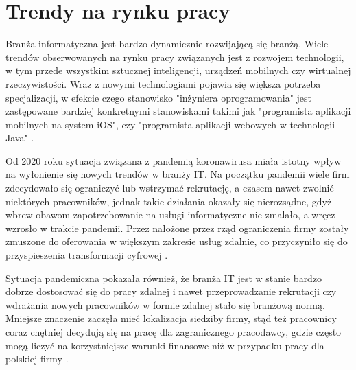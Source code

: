 


\section{Trendy na rynku pracy}

Branża informatyczna jest bardzo dynamicznie rozwijającą się branżą.
Wiele trendów obserwowanych na rynku pracy związanych jest z rozwojem technologii, w tym przede wszystkim sztucznej inteligencji, urządzeń mobilnych czy wirtualnej rzeczywistości.
Wraz z nowymi technologiami pojawia się większa potrzeba specjalizacji, w efekcie czego stanowisko "inżyniera oprogramowania" jest zastępowane bardziej konkretnymi stanowiskami takimi jak "programista aplikacji mobilnych na system iOS", czy "programista aplikacji webowych w technologii Java" \cite{it-polyglots-2015}.

Od 2020 roku sytuacja związana z pandemią koronawirusa miała istotny wpływ na wyłonienie się nowych trendów w branży IT.
Na początku pandemii wiele firm zdecydowało się ograniczyć lub wstrzymać rekrutację, a czasem nawet zwolnić niektórych pracowników, jednak takie działania okazały się nierozsądne, gdyż wbrew obawom zapotrzebowanie na usługi informatyczne nie zmalało, a wręcz wzrosło w trakcie pandemii.
Przez nałożone przez rząd ograniczenia firmy zostały zmuszone do oferowania w większym zakresie usług zdalnie, co przyczyniło się do przyspieszenia transformacji cyfrowej \cite{it-covid-2021}.

Sytuacja pandemiczna pokazała również, że branża IT jest w stanie bardzo dobrze dostosować się do pracy zdalnej i nawet przeprowadzanie rekrutacji czy wdrażania nowych pracowników w formie zdalnej stało się branżową normą.
Mniejsze znaczenie zaczęła mieć lokalizacja siedziby firmy, stąd też pracownicy coraz chętniej decydują się na pracę dla zagranicznego pracodawcy, gdzie często mogą liczyć na korzystniejsze warunki finansowe niż w przypadku pracy dla polskiej firmy \cite{it-covid-2021}.

